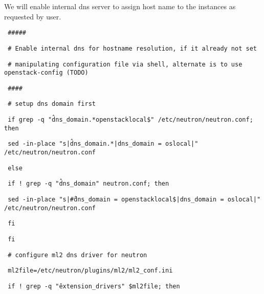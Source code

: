\documentclass[12pt]{article}
\begin{document}
We will enable internal dns server to assign host name to the instances as requested by user. 

\begin{bash}\texttt{\small{ \#\#\#\#\#}}\end{bash}
\begin{bash}\texttt{\small{ \# Enable internal dns for hostname resolution, if it already not set}}\end{bash}
\begin{bash}\texttt{\small{ \# manipulating configuration file via shell, alternate is to use openstack-config (TODO)}}\end{bash}
\begin{bash}\texttt{\small{ \#\#\#\#}}\end{bash}
\begin{bash}\texttt{\small{ \# setup dns domain first}}\end{bash}
\begin{bash}\texttt{\small{ if grep -q "\^dns\_domain.*openstacklocal\$" /etc/neutron/neutron.conf; then}}\end{bash}
\begin{bash}\texttt{\small{    sed -in-place  "s|\^dns\_domain.*|dns\_domain = oslocal|" /etc/neutron/neutron.conf}}\end{bash}
\begin{bash}\texttt{\small{ else}}\end{bash}
\begin{bash}\texttt{\small{    if ! grep -q "\^dns\_domain" neutron.conf; then}}\end{bash}
\begin{bash}\texttt{\small{        sed -in-place  "s|\^\#dns\_domain = openstacklocal\$|dns\_domain = oslocal|" /etc/neutron/neutron.conf}}\end{bash}
\begin{bash}\texttt{\small{    fi}}\end{bash}
\begin{bash}\texttt{\small{ fi}}\end{bash}
\begin{bash}\texttt{\small{ \# configure ml2 dns driver for neutron}}\end{bash}
\begin{bash}\texttt{\small{ ml2file=/etc/neutron/plugins/ml2/ml2\_conf.ini}}\end{bash}
\begin{bash}\texttt{\small{ if ! grep -q "\^extension\_drivers" \$ml2file; then}}\end{bash}
\end{document}
